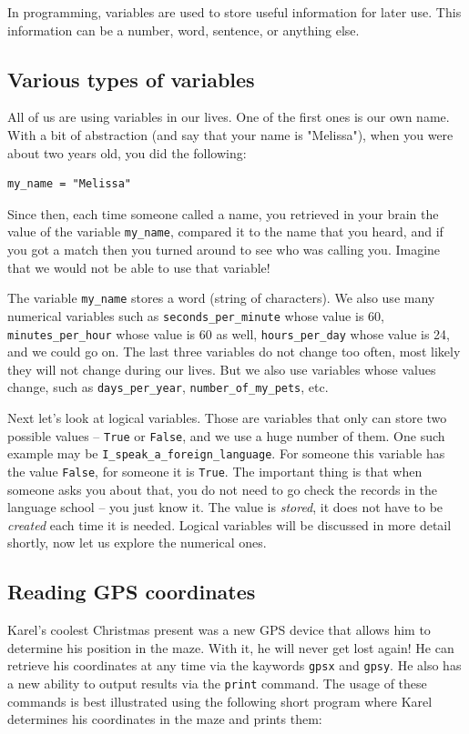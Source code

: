 {{{{\noindent
In programming, variables are used to store useful information for later use. This information can 
be a number, word, sentence, or anything else. 

\subsection{Various types of variables}

All of us are using variables in our lives. One of 
the first ones is our own name. With a bit of abstraction (and say that your name is "Melissa"), 
when you were about two years old, you did the following:

\begin{verbatim}
my_name = "Melissa"
\end{verbatim}
Since then, each time someone called a name, you retrieved in your brain the value of the variable
{\tt my\_name}, compared it to the name that you heard, and if you got a match then you turned around 
to see who was calling you. Imagine that we would not be able to use that variable!

The variable {\tt my\_name} stores a word (string of characters). We also use many numerical variables such as
{\tt seconds\_per\_minute} whose value is 60, {\tt minutes\_per\_hour} whose value is 60 as well, 
{\tt hours\_per\_day} whose value is 24, and we could go on. The last three variables do not change 
too often, most likely they will not change during our lives. But we also use variables whose 
values change, such as {\tt days\_per\_year}, {\tt number\_of\_my\_pets}, etc.

Next let's look at logical variables. Those are variables that only can store two possible values --
{\tt True} or {\tt False}, and we use a huge number of them. One such example may be {\tt I\_speak\_a\_foreign\_language}.
For someone this variable has the value {\tt False}, for someone it is {\tt True}. The important 
thing is that when someone asks you about that, you do not need to go check the records in the language 
school -- you just know it. The value is {\em stored}, it does not have to be {\em created} each time 
it is needed. Logical variables will be discussed in more detail shortly, now let us explore 
the numerical ones.

\subsection{Reading GPS coordinates}

Karel's coolest Christmas present was a new GPS device that allows him to determine his position 
in the maze. With it, he will never get lost again! He can retrieve his coordinates at any time via the 
kaywords {\tt gpsx} and {\tt gpsy}. He also has a new ability to output results via the {\tt print} 
command. The usage of these commands is best illustrated using the following short program where 
Karel determines his coordinates in the maze and prints them:

}}}}
